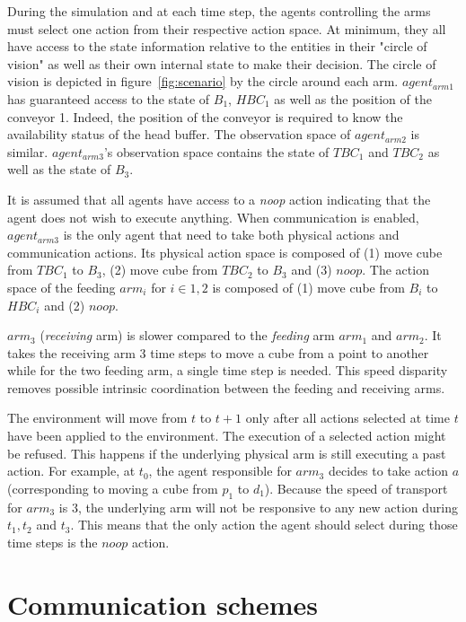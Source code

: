 During the simulation and at each time step, the agents controlling the arms must select one action from their respective action space. At minimum, they all have access to the state information relative to the entities in their "circle of vision" as well as their own internal state to make their decision. The circle of vision is depicted in figure~\ref{fig:scenario} by the circle around each arm. $agent_{arm1}$ has guaranteed access to the state of $B_1$, $HBC_1$ as well as the position of the conveyor 1. Indeed, the position of the conveyor is required to know the availability status of the head buffer. The observation space of $agent_{arm2}$ is similar. $agent_{arm3}$'s observation space contains the state of $TBC_1$ and $TBC_2$ as well as the state of $B_3$. 

It is assumed that all agents have access to a \textit{noop} action indicating that the agent does not wish to execute anything.   When communication is enabled, $agent_{arm3}$ is the only agent that need to take both physical actions and communication actions. Its physical action space is composed of (1) move cube from $TBC_1$ to $B_3$, (2) move cube from $TBC_2$ to $B_3$ and (3) $noop$. The action space of the feeding $arm_i$ for $i \in {1,2}$ is composed of (1) move cube from $B_i$ to $HBC_i$ and (2) $noop$.

$arm_3$ (\textit{receiving} arm) is slower compared to the \textit{feeding} arm $arm_1$ and $arm_2$. It takes the receiving arm 3 time steps to move a cube from a point to another while for the two feeding arm, a single time step is needed. This speed disparity removes possible intrinsic coordination between the feeding and receiving arms. 

The environment will move from $t$ to $t+1$ only after all actions selected at time $t$ have been applied to the environment. The execution of a selected action might be refused. This happens if the underlying physical arm is still executing a past action. For example, at $t_0$, the agent responsible for $arm_3$ decides to take action $a$ (corresponding to moving a cube from $p_1$ to $d_1$). Because the speed of transport for $arm_3$ is $3$, the underlying arm will not be responsive to any new action during $t_1, t_2$ and $t_3$. This means that the only action the agent should select during those time steps is the $noop$ action.

\section{Communication schemes}
\label{sec:communication-schemes}

